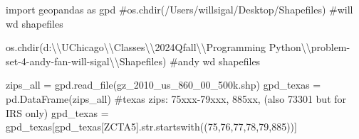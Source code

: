 \documentclass[
  letterpaper,
  DIV=11,
  numbers=noendperiod]{scrartcl}
\newenvironment{Shaded}{\begin{snugshade}}{\end{snugshade}}
\newcommand{\BuiltInTok}[1]{\textcolor[rgb]{0.00,0.23,0.31}{#1}}
\newcommand{\CharTok}[1]{\textcolor[rgb]{0.13,0.47,0.30}{#1}}
\newcommand{\CommentTok}[1]{\textcolor[rgb]{0.37,0.37,0.37}{#1}}
\newcommand{\ImportTok}[1]{\textcolor[rgb]{0.00,0.46,0.62}{#1}}
\newcommand{\NormalTok}[1]{\textcolor[rgb]{0.00,0.23,0.31}{#1}}
\newcommand{\OperatorTok}[1]{\textcolor[rgb]{0.37,0.37,0.37}{#1}}
\newcommand{\StringTok}[1]{\textcolor[rgb]{0.13,0.47,0.30}{#1}}
\begin{document}
\begin{Shaded}
\begin{Highlighting}[]
\ImportTok{import}\NormalTok{ geopandas }\ImportTok{as}\NormalTok{ gpd}
\CommentTok{\#os.chdir(\textquotesingle{}/Users/willsigal/Desktop/Shapefiles\textquotesingle{}) \#will wd shapefiles}

\NormalTok{os.chdir(}\StringTok{\textquotesingle{}d:}\CharTok{\textbackslash{}\textbackslash{}}\StringTok{UChicago}\CharTok{\textbackslash{}\textbackslash{}}\StringTok{Classes}\CharTok{\textbackslash{}\textbackslash{}}\StringTok{2024Qfall}\CharTok{\textbackslash{}\textbackslash{}}\StringTok{Programming Python}\CharTok{\textbackslash{}\textbackslash{}}\StringTok{problem{-}set{-}4{-}andy{-}fan{-}will{-}sigal}\CharTok{\textbackslash{}\textbackslash{}}\StringTok{Shapefiles\textquotesingle{}}\NormalTok{) }\CommentTok{\#andy wd shapefiles}

\NormalTok{zips\_all }\OperatorTok{=}\NormalTok{ gpd.read\_file(}\StringTok{\textquotesingle{}gz\_2010\_us\_860\_00\_500k.shp\textquotesingle{}}\NormalTok{)}
\NormalTok{gpd\_texas }\OperatorTok{=}\NormalTok{ pd.DataFrame(zips\_all)}
\CommentTok{\#texas zips: 75xxx{-}79xxx, 885xx, (also 73301 but for IRS only)}
\NormalTok{gpd\_texas }\OperatorTok{=}\NormalTok{ gpd\_texas[gpd\_texas[}\StringTok{\textquotesingle{}ZCTA5\textquotesingle{}}\NormalTok{].}\BuiltInTok{str}\NormalTok{.startswith((}\StringTok{\textquotesingle{}75\textquotesingle{}}\NormalTok{,}\StringTok{\textquotesingle{}76\textquotesingle{}}\NormalTok{,}\StringTok{\textquotesingle{}77\textquotesingle{}}\NormalTok{,}\StringTok{\textquotesingle{}78\textquotesingle{}}\NormalTok{,}\StringTok{\textquotesingle{}79\textquotesingle{}}\NormalTok{,}\StringTok{\textquotesingle{}885\textquotesingle{}}\NormalTok{))]}
\end{Highlighting}
\end{Shaded}
\end{document}
